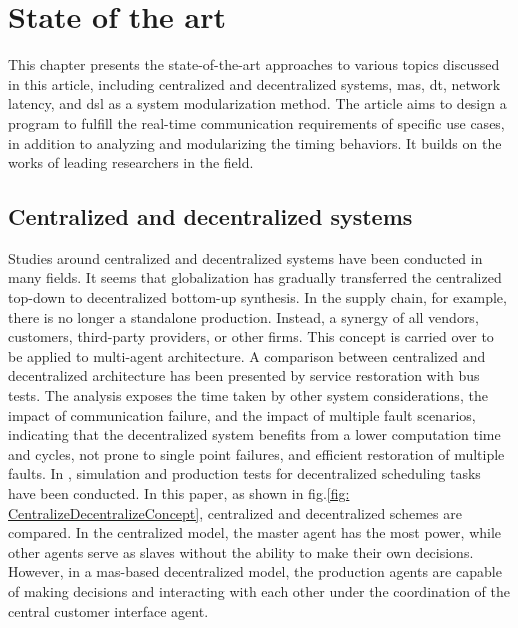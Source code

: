 \chapter{State of the art}\label{chap: S-O-T-A}
This chapter presents the state-of-the-art approaches to various topics 
discussed 
in this article, including centralized and decentralized systems, 
\gls{mas}, \gls{dt}, network latency, 
and \gls{dsl} as a system modularization method. The article aims to 
design a program to fulfill the real-time communication requirements 
of specific use cases, in addition to analyzing and modularizing the 
timing behaviors. 
It builds on the works of leading researchers in the field.


\section{Centralized and decentralized systems}
Studies around centralized and decentralized systems have been conducted 
in many fields. It seems that globalization has gradually transferred the 
centralized top-down to decentralized bottom-up synthesis\cite{ueda_emergent_2004}.   
In the supply chain, for example, there is no longer a standalone production. Instead, 
a synergy of all vendors, customers, third-party providers, or other
ﬁrms\cite{mahapatra_modeling_2003}. This concept is carried over to be applied to multi-agent architecture. A comparison between centralized and decentralized 
architecture has been presented by service restoration with bus tests\cite{sharma_comparative_2016}. The 
analysis exposes the time taken by other system considerations, the impact 
of communication failure, and the impact of multiple fault scenarios, indicating 
that the decentralized system benefits from a lower computation time and cycles, 
not prone to single point failures, and efficient restoration of 
multiple faults. 
In \cite{egger_deployment-friendly_2020}, simulation and production tests 
for decentralized scheduling tasks have been conducted. In this paper, as shown 
in fig.\ref{fig: CentralizeDecentralizeConcept}, centralized and decentralized 
schemes are compared. In the centralized model, the master agent has the most power, 
while other agents serve as slaves without the ability to make their own decisions. 
However, in a \gls{mas}-based decentralized model, the production agents are 
capable of making decisions and interacting with each other under the coordination 
of the central customer interface agent. 

